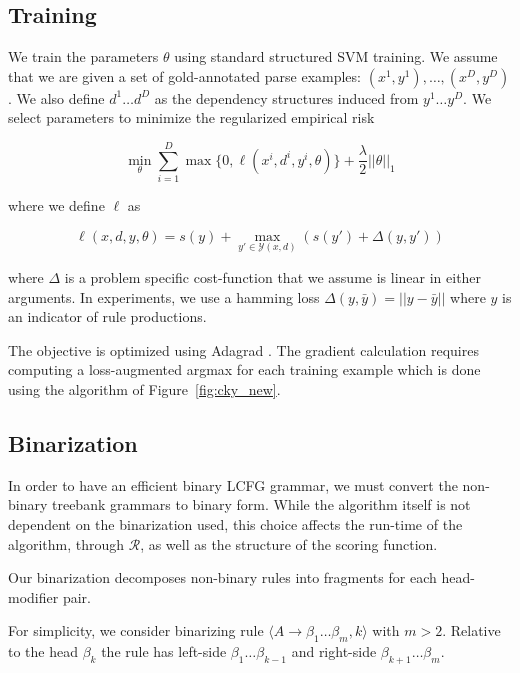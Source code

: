 \documentclass[11pt,letterpaper]{article}
\newcommand{\rules}{\mathcal{R}}
\begin{document}
\subsection{Training}

We train the parameters $\theta$ using standard structured SVM training.
We assume that we are given a set of gold-annotated parse examples: $( x^{1}, y^{1}), \ldots,  (x^{D}, y^{D})$. We also define $d^{1} \ldots d^{D}$ as the dependency structures induced from $y^{1} \ldots y^{D}$.
We select parameters to minimize the regularized empirical risk

\[ \min_{\theta} \sum_{i = 1}^D \max\{0,  \ell( x^{i}, d^{i} , y^{i}, \theta) \} + \frac{\lambda}{2} ||\theta||_1 \]

\noindent where we define $\ell$ as

\[\ell(x, d, y, \theta) = s(y) + \max_{y' \in \mathcal{Y}(x, d)}\left(s(y')  + \Delta(y, y') \right) \]


\noindent where $\Delta$ is a problem specific cost-function that we assume is linear in either arguments.
In experiments, we use a hamming loss  $\Delta(y, \bar{y}) = || y - \bar{y}||$ where $y$ is an indicator
of rule productions.

The objective is optimized using Adagrad \cite{}.  The gradient
calculation requires computing a loss-augmented argmax for each
training example which is done using the algorithm of Figure~\ref{fig:cky_new}.

\subsection{Binarization}

In order to have an efficient binary LCFG grammar, we must convert the
non-binary treebank grammars to binary form.  While the algorithm
itself is not dependent on the binarization used, this choice affects
the run-time of the algorithm, through $\rules$, as well as the
structure of the scoring function.

Our binarization decomposes non-binary rules into fragments for
each head-modifier pair.


For simplicity, we consider binarizing rule $\langle A \rightarrow \beta_1 \ldots \beta_m,
k\rangle$ with $m > 2$. Relative to the head $\beta_k$
the rule has left-side $\beta_1 \ldots \beta_{k-1}$ and right-side
$\beta_{k+1} \ldots \beta_m$.
\end{document}
